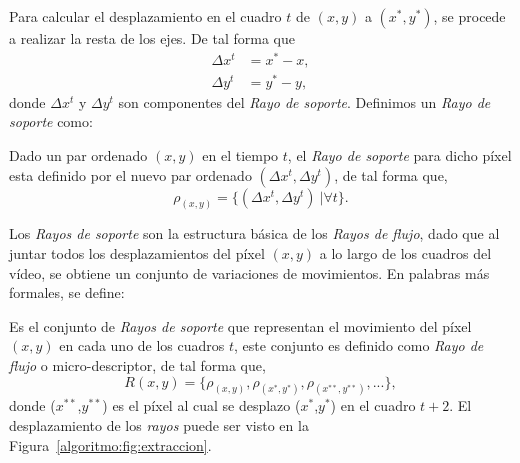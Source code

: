 	Para calcular el desplazamiento en el cuadro $t$ de $(x,y)$ a $(x^*,y^*)$, se procede a realizar la resta de los ejes. De tal forma que
	\begin{align}
		\Delta x^{t} &= x^*-x,\\ 
		\Delta y^{t} &= y^*-y,
	\end{align}
		donde $ \Delta x^t$ y $ \Delta y^t$ son componentes del \textit{Rayo de soporte}. Definimos un \textit{Rayo de soporte} como:
	
	\begin{definition}
		Dado un par ordenado $(x,y)$ en el tiempo $t$, el \textit{Rayo de soporte} para dicho píxel esta definido por el nuevo par ordenado $(\Delta x^{t}, \Delta y^{t})$, de tal forma que,
		\begin{equation}
			\rho_{(x,y)} = \{(\Delta x^{t}, \Delta y^{t})~| \forall t\}.
		\end{equation}		
	\end{definition}	
		
		
		
	Los \textit{Rayos de soporte} son la estructura básica de los \textit{Rayos de flujo}, dado que al juntar todos los desplazamientos del píxel $(x,y)$ a lo largo de los cuadros del vídeo, se obtiene un conjunto de variaciones de movimientos. En palabras más formales, se define:
	
	\begin{definition}	
		Es el conjunto de \textit{Rayos de soporte} que representan el movimiento del píxel $(x,y)$ en cada uno de los cuadros $t$, este conjunto es definido como \textit{Rayo de flujo} o micro-descriptor, de tal forma que,
			\begin{equation}
				R(x,y)	 = \{\rho_{(x,y)}, \rho_{(x^*,y^*)}, \rho_{(x^{**},y^{**})}, ... \},
			\end{equation}
		donde ($x^{**}$,$y^{**}$) es el píxel al cual se desplazo ($x^{*}$,$y^{*}$) en el cuadro $t+2$. El desplazamiento de los \textit{rayos} puede ser visto en la Figura~\ref{algoritmo:fig:extraccion}.
	\end{definition}
	
	

	
		
		
